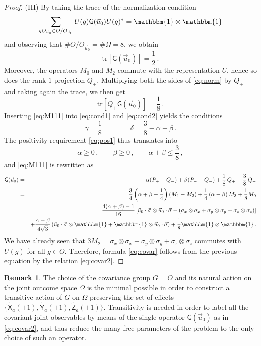 \documentclass[12pt]{amsart}
\theoremstyle{definition}
\newtheorem{remark}{Remark}
\newcommand{\tr}[1]{\mathrm{tr}\left[#1\right]} %
\newcommand{\id}{\mathbbm{1}} %
\newcommand{\G}{\mathsf{G}}%
\newcommand{\X}{\mathsf{X}}%
\newcommand{\Y}{\mathsf{Y}}%
\newcommand{\Z}{\mathsf{Z}}%
\begin{document}
\begin{proof}
(III) By taking the trace of the normalization condition
\begin{equation}\label{eq:norm}
\sum_{gO_{\vec{u}_0}\in O/O_{\vec{u}_0}} U(g)\G(\vec{u}_0)U(g)^* = \id\otimes\id
\end{equation}
and observing that $\# O/O_{\vec{u}_0} = \#\Omega = 8$, we obtain
\begin{equation}\label{eq:cond1}
\tr{\G(\vec{u}_0)} = \frac{1}{2} \,.
\end{equation}
Moreover, the operators $M_0$ and $M_2$ commute with the representation $U$, hence so does the rank-$1$ projection $Q_+$. Multiplying both the sides of \eqref{eq:norm} by $Q_+$ and taking again the trace, we then get
\begin{equation}\label{eq:cond2}
\tr{Q_+\G(\vec{u}_0)} = \frac{1}{8} \,.
\end{equation}
Inserting \eqref{eq:M111} into \eqref{eq:cond1} and \eqref{eq:cond2} yields the conditions
$$
\gamma = \frac{1}{8} \qquad \qquad \delta = \frac{3}{8} - \alpha - \beta \,.
$$
The positivity requirement \eqref{eq:pos1} thus translates into
\begin{equation*}
\alpha\geq 0\,, \qquad \beta\geq 0\,, \qquad \alpha+\beta\leq\frac{3}{8} \,,
\end{equation*}
and \eqref{eq:M111} is rewritten as
\begin{eqnarray*}
\G(\vec{u}_0) & = & \alpha (P_+ - Q_-) + \beta (P_- - Q_-) + \frac{1}{8}\,Q_+ + \frac{3}{8}\,Q_- \\
& = & \frac{3}{4}\left(\alpha+\beta-\frac{1}{4}\right) (M_1-M_2) + \frac{1}{4}\left(\alpha-\beta\right) M_3 + \frac{1}{8} M_0 \\
& = & \frac{4(\alpha+\beta)-1}{16} \left[\vec{u}_0\cdot\vec{\sigma}\otimes\vec{u}_0\cdot\vec{\sigma} - (\sigma_x\otimes\sigma_x + \sigma_y\otimes\sigma_y + \sigma_z\otimes\sigma_z)\right] \\
&& + \frac{\alpha-\beta}{4\sqrt{3}} \left(\vec{u}_0\cdot\vec{\sigma}\otimes\id + \id\otimes\vec{u}_0\cdot\vec{\sigma}\right) + \frac{1}{8} \id\otimes\id \,.
\end{eqnarray*}
We have already seen that $3M_2 = \sigma_x\otimes\sigma_x + \sigma_y\otimes\sigma_y + \sigma_z\otimes\sigma_z$ commutes with $U(g)$ for all $g\in O$. Therefore, formula \eqref{eq:covar} follows from the previous equation by the relation \eqref{eq:covar2}.
\end{proof}

\begin{remark}\label{rem:covar}
The choice of the covariance group $G = O$ and its natural action on the joint outcome space $\Omega$ is the minimal possible in order to construct a transitive action of $G$ on $\Omega$ preserving the set of effects $\{\widetilde{\X}_a(\pm 1), \widetilde{\Y}_a(\pm 1), \widetilde{\Z}_a(\pm 1)\}$. Transitivity is needed in order to label all the covariant joint observables by means of the single operator $\G(\vec{u}_0)$ as in \eqref{eq:covar2}, and thus reduce the many free parameters of the problem to the only choice of such an operator.
\end{remark}
\end{document}
